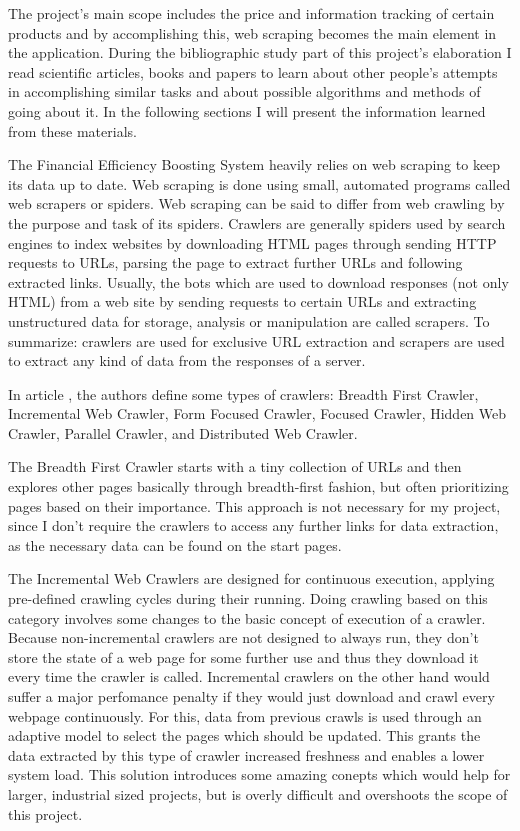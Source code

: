 \documentclass[12pt,a4paper,twoside]{report}
\begin{document}
The project's main scope includes the price and information tracking of certain products and by accomplishing this, web scraping becomes the main element in the application. During the bibliographic study part of this project's elaboration I read scientific articles, books and papers to learn about other people's attempts in accomplishing similar tasks and about possible algorithms and methods of going about it. In the following sections I will present the information learned from these materials.

The Financial Efficiency Boosting System heavily relies on web scraping to keep its data up to date. Web scraping is done using small, automated programs called web scrapers or spiders. Web scraping can be said to differ from web crawling by the purpose and task of its spiders. Crawlers are generally spiders used by search engines to index websites by downloading HTML pages through sending HTTP requests to URLs, parsing the page to extract further URLs and following extracted links. Usually, the bots which are used to download responses (not only HTML) from a web site by sending requests to certain URLs and extracting unstructured data for storage, analysis or manipulation are called scrapers. To summarize: crawlers are used for exclusive URL extraction and scrapers are used to extract any kind of data from the responses of a server.

In article \cite{crawlers_paper1}, the authors define some types of crawlers: Breadth First Crawler, Incremental Web Crawler, Form Focused Crawler, Focused Crawler, Hidden Web Crawler, Parallel Crawler, and Distributed Web Crawler.

The Breadth First Crawler starts with a tiny collection of URLs and then explores other pages basically through breadth-first fashion, but often prioritizing pages based on their importance. This approach is not necessary for my project, since I don't require the crawlers to access any further links for data extraction, as the necessary data can be found on the start pages.

The Incremental Web Crawlers are designed for continuous execution, applying pre-defined crawling cycles during their running. Doing crawling based on this category involves some changes to the basic concept of execution of a crawler. Because non-incremental crawlers are not designed to always run, they don't store the state of a web page for some further use and thus they download it every time the crawler is called. Incremental crawlers on the other hand would suffer a major perfomance penalty if they would just download and crawl every webpage continuously. For this, data from previous crawls is used through an adaptive model to select the pages which should be updated. This grants the data extracted by this type of crawler increased freshness and enables a lower system load. This solution introduces some amazing conepts which would help for larger, industrial sized projects, but is overly difficult and overshoots the scope of this project.
\end{document}
